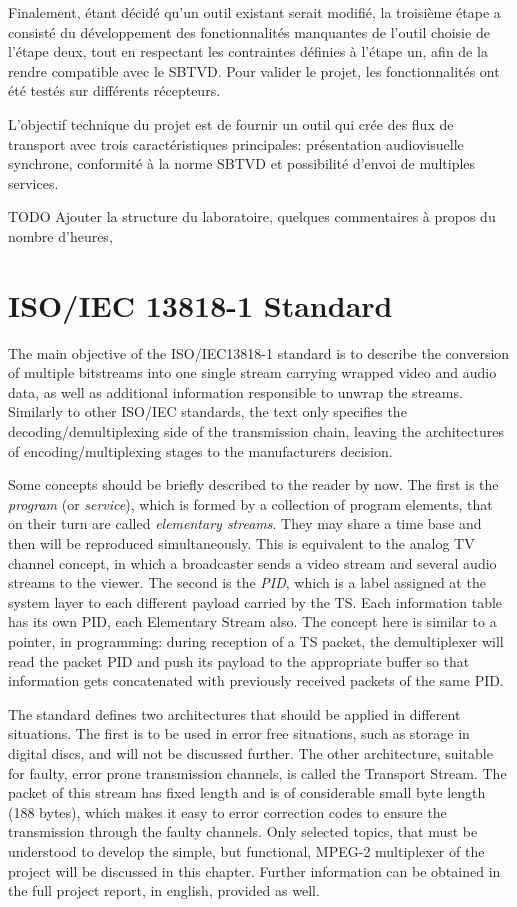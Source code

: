 \documentclass[12pt,a4paper]{article}
\begin{document}
Finalement, étant décidé qu'un outil existant serait modifié, la troisième étape a consisté du développement des fonctionnalités manquantes de l'outil choisie de l'étape deux, tout en respectant les contraintes définies à l'étape un, afin de la  rendre compatible avec le SBTVD. Pour valider le projet, les fonctionnalités ont été testés sur différents récepteurs.

L'objectif technique du projet est de fournir un outil qui crée des flux de transport avec trois caractéristiques principales: présentation audiovisuelle synchrone, conformité à la norme SBTVD et possibilité d'envoi de multiples services. 

TODO Ajouter la structure du laboratoire, quelques commentaires à propos du nombre d'heures,

\section{ISO/IEC 13818-1 Standard}
\label{iso13818}

The main objective of the ISO/IEC13818-1 standard is to describe the conversion of multiple bitstreams into one single stream carrying wrapped video and audio data, as well as additional information responsible to unwrap the streams. Similarly to other ISO/IEC standards, the text only specifies the decoding/demultiplexing side of the transmission chain, leaving the architectures of encoding/multiplexing stages to the manufacturers decision.

Some concepts should be briefly described to the reader by now. The first is the \textit{program} (or \textit{service}), which is formed by a collection of program elements, that on their turn are called \textit{elementary streams}. They may share a time base and then will be reproduced simultaneously. This is equivalent to the analog TV channel concept, in which a broadcaster sends a video stream and several audio streams to the viewer. The second is the \textit{PID}, which is a label assigned at the system layer to each different payload carried by the TS. Each information table has its own PID, each Elementary Stream also. The concept here is similar to a pointer, in programming: during reception of a TS packet, the demultiplexer will read the packet PID and push its payload to the appropriate buffer so that information gets concatenated with previously received packets of the same PID.

The standard defines two architectures that should be applied in different situations. The first is to be used in error free situations, such as storage in digital discs, and will not be discussed further. The other architecture, suitable for faulty, error prone transmission channels, is called the Transport Stream. The packet of this stream has fixed length and is of considerable small byte length (188 bytes), which makes it easy to error correction codes to ensure the transmission through the faulty channels. Only selected topics, that must be understood to develop the simple, but functional, MPEG-2 multiplexer of the project will be discussed in this chapter. Further information can be obtained in the full project report, in english, provided as well.
\end{document}
